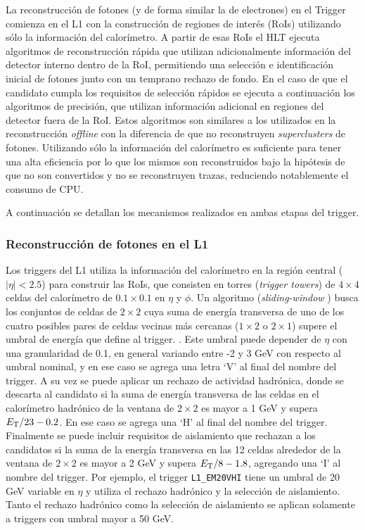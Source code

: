 La reconstrucción de fotones \cite{TRIG-2018-05} (y de forma similar la de electrones) en el Trigger comienza en el L1 con la construcción de regiones de interés (RoIs) utilizando sólo la información del calorímetro. A partir de esas RoIs el HLT ejecuta algoritmos de reconstrucción rápida que utilizan adicionalmente información del detector interno dentro de la RoI, permitiendo una selección e identificación inicial de fotones junto con un temprano rechazo de fondo. En el caso de que el candidato cumpla los requisitos de selección rápidos se ejecuta a continuación los algoritmos de precisión, que utilizan información adicional en regiones del detector fuera de la RoI. Estos algoritmos son similares a los utilizados en la reconstrucción \textit{offline} con la diferencia de que no reconstruyen \textit{superclusters} de fotones. Utilizando sólo la información del calorímetro es suficiente para tener una alta eficiencia por lo que los mismos son reconstruidos bajo la hipótesis de que no son convertidos y no se reconstruyen trazas, reduciendo notablemente el consumo de CPU. 

A continuación se detallan los mecanismos realizados en ambas etapas del trigger.

\subsubsection{Reconstrucción de fotones en el L1}

Los triggers del L1 
 \commentNotaII 
utiliza la información del calorímetro en la región central ($|\eta|<2.5$) para construir las RoIs, que consisten en torres (\textit{trigger towers}) de $4\times4$ celdas del calorímetro de $0.1\times0.1$ en $\eta$ y $\phi$. Un algoritmo (\textit{sliding-window} \cite{Lampl:1099735}) busca los conjuntos de celdas de $2\times2$ cuya suma de energía transversa de uno de los cuatro posibles pares de celdas vecinas más cercanas ($1\times2$ o $2\times1$) supere el umbral de energía que define al trigger. 
 . 
Este umbral puede depender de $\eta$ con una granularidad de 0.1, en general variando entre -2 y 3 GeV con respecto al umbral nominal, y en ese caso se agrega una letra `V' al final del nombre del trigger. A su vez se puede aplicar un rechazo de actividad hadrónica, donde se descarta al candidato si la suma de energía transversa de las celdas en el calorímetro hadrónico de la ventana de $2\times2$ es mayor a 1 GeV y supera $E_{\text{T}}/23-0.2$. En ese caso se agrega una `H' al final del nombre del trigger. Finalmente se puede incluir requisitos de aislamiento que rechazan a los candidatos si la suma de la energía transversa en las 12 celdas alrededor de la ventana de $2\times2$ es mayor a 2 GeV y supera $E_{\text{T}}/8-1.8$, agregando una `I' al nombre del trigger. Por ejemplo, el trigger \texttt{L1\_EM20VHI} tiene un umbral de 20 GeV variable en $\eta$ y utiliza el rechazo hadrónico y la selección de aislamiento. Tanto el rechazo hadrónico como la selección de aislamiento se aplican solamente a triggers con umbral mayor a 50 GeV.

